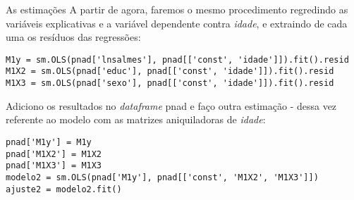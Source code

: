 \documentclass[11pt]{beamer}
\begin{document}
\begin{frame}[fragile]{As estimações}
A partir de agora, faremos o mesmo procedimento regredindo as variáveis explicativas e a variável dependente contra \textit{idade}, e extraindo de cada uma os resíduos das regressões:
\begin{lstlisting}
M1y = sm.OLS(pnad['lnsalmes'], pnad[['const', 'idade']]).fit().resid
M1X2 = sm.OLS(pnad['educ'], pnad[['const', 'idade']]).fit().resid
M1X3 = sm.OLS(pnad['sexo'], pnad[['const', 'idade']]).fit().resid
\end{lstlisting}
Adiciono os resultados no \textit{dataframe} pnad e faço outra estimação - dessa vez referente ao modelo com as matrizes aniquiladoras de \textit{idade}:
\begin{lstlisting}
pnad['M1y'] = M1y
pnad['M1X2'] = M1X2
pnad['M1X3'] = M1X3
modelo2 = sm.OLS(pnad['M1y'], pnad[['const', 'M1X2', 'M1X3']])
ajuste2 = modelo2.fit()

\end{lstlisting}

\end{frame}
\end{document}

